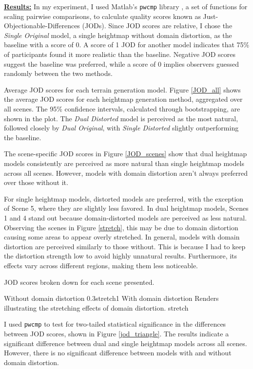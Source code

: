 \textbf{\underline{Results:}} In my experiment, I used Matlab's \texttt{pwcmp} library \cite{perez-ortiz_practical_2017}, a set of functions for scaling pairwise comparisons, to calculate quality scores known as Just-Objectionable-Differences (JODs). Since JOD scores are relative, I chose the \textit{Single Original} model, a single heightmap without domain distortion, as the baseline with a score of 0. A score of 1 JOD for another model indicates that 75\% of participants found it more realistic than the baseline. Negative JOD scores suggest the baseline was preferred, while a score of 0 implies observers guessed randomly between the two methods.

{Average JOD scores for each terrain generation model.}{
Figure \ref{JOD_all} shows the average JOD scores for each heightmap generation method, aggregated over all scenes. The 95\% confidence intervals, calculated through bootstrapping, are shown in the plot. The \textit{Dual Distorted} model is perceived as the most natural, followed closely by \textit{Dual Original}, with \textit{Single Distorted} slightly outperforming the baseline.
}


The scene-specific JOD scores in Figure \ref{JOD_scenes} show that dual heightmap models consistently are perceived as more natural than single heightmap models across all scenes. However, models with domain distortion aren't always preferred over those without it. 

For single heightmap models, distorted models are preferred, with the exception of Scene 5, where they are slightly less favored. In dual heightmap models, Scenes 1 and 4 stand out because domain-distorted models are perceived as less natural. Observing the scenes in Figure \ref{stretch}, this may be due to domain distortion causing some areas to appear overly stretched. In general, models with domain distortion are perceived similarly to those without. This is because I had to keep the distortion strength low to avoid highly unnatural results. Furthermore, its effects vary across different regions, making them less noticeable.

{JOD scores broken down for each scene presented.}

{Without domain distortion}
{0.3}{stretch1}
{With domain distortion}
{Renders illustrating the stretching effects of domain distortion.}
{stretch}

I used \texttt{pwcmp} to test for two-tailed statistical significance in the differences between JOD scores, shown in Figure \ref{jod_triangle}. The results indicate a significant difference between dual and single heightmap models across all scenes. However, there is no significant difference between models with and without domain distortion.

